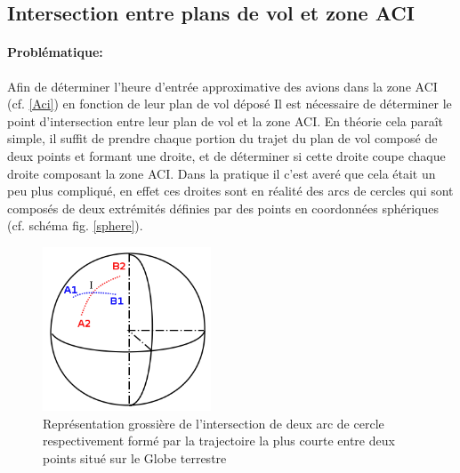     \subsection{Intersection entre plans de vol et zone ACI\label{mathcoord}}
            \paragraph{Problématique:}
Afin de déterminer l'heure d'entrée approximative des avions dans la zone ACI (cf. \vref{Aci}) en fonction de leur plan de vol déposé Il est nécessaire de déterminer le point d'intersection entre leur plan de vol et la zone ACI. En théorie cela paraît simple, il suffit de prendre chaque portion du trajet du plan de vol composé de deux points et formant une droite, et  de déterminer si cette droite coupe chaque droite composant la zone ACI. Dans la pratique il c'est averé que cela était un peu plus compliqué, en effet ces droites sont en réalité des arcs de cercles qui sont composés de deux extrémités définies par des points en coordonnées sphériques (cf. schéma fig. \vref{sphere}).
\begin{figure}
    \center
    \includegraphics[width=5cm]{images/Sphere.png}
    \caption{Représentation grossière de l'intersection de deux arc de cercle respectivement formé par la trajectoire la plus courte entre deux points situé sur le Globe terrestre}
    \label{sphere}
\end{figure}
